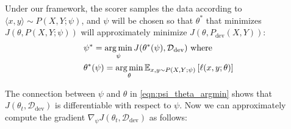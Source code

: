 Under our framework, the scorer samples the data according to $\langle x, y \rangle \sim P(X, Y; \psi)$, and $\psi$ will be chosen so that $\theta^*$ that minimizes $J(\theta, P(X, Y;\psi))$ will approximately minimize $J(\theta, P_\text{dev}(X,Y))$: 
\begin{equation}
  \label{eqn:psi_theta_argmin}
  \begin{aligned}
   & \psi^* = \operatorname*{arg\,min}_\psi
  J(\theta^*(\psi), \mathcal{D}_\text{dev}) 
    ~\text{where}~ \\
   & \theta^*(\psi) = \operatorname*{arg\,min}_\theta \mathbb{E}_{x, y \sim P(X, Y; \psi)} \left[ \ell(x, y; \theta) \right]
  \end{aligned}
\end{equation}

The connection between $\psi$ and $\theta$ in \autoref{eqn:psi_theta_argmin} shows that $J(\theta_t, \mathcal{D}_\text{dev})$ is differentiable with respect to $\psi$. Now we can approximately compute the gradient $\nabla_\psi J(\theta_t, \mathcal{D}_\text{dev})$ as follows:

